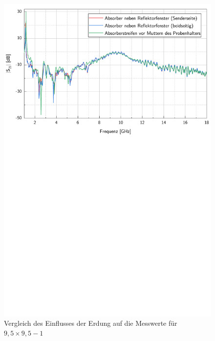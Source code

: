 \begin{figure}[H]
    \centering
    \includegraphics[page = 2, width = .99\textwidth, trim = 0cm 15.6cm 0cm 0cm, clip]{Abbildungen/Kapitel4/Messergebnisse/9k5x9k5-1.pdf}
    \caption[Vergleich des Einflusses der Erdung auf die Messwerte]{Vergleich des Einflusses der Erdung auf die Messwerte für \mbox{$9,5\times9,5-1$}}
    \label{fig:4_9k5x9k5-1_Erdung}
\end{figure}

